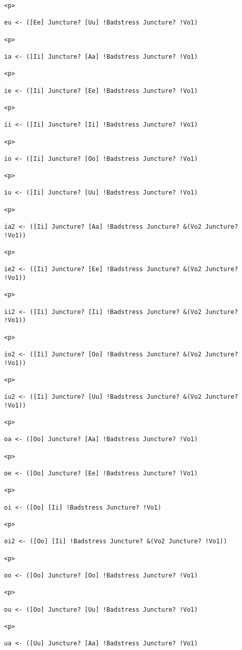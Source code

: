 \documentclass[12pt]{article}
\begin{document}
\begin{lstlisting}
<p>

eu <- ([Ee] Juncture? [Uu] !Badstress Juncture? !Vo1)

<p>

ia <- ([Ii] Juncture? [Aa] !Badstress Juncture? !Vo1)

<p>

ie <- ([Ii] Juncture? [Ee] !Badstress Juncture? !Vo1)

<p>

ii <- ([Ii] Juncture? [Ii] !Badstress Juncture? !Vo1)

<p>

io <- ([Ii] Juncture? [Oo] !Badstress Juncture? !Vo1)

<p>

iu <- ([Ii] Juncture? [Uu] !Badstress Juncture? !Vo1)

<p>

ia2 <- ([Ii] Juncture? [Aa] !Badstress Juncture? &(Vo2 Juncture? !Vo1))

<p>

ie2 <- ([Ii] Juncture? [Ee] !Badstress Juncture? &(Vo2 Juncture? !Vo1))

<p>

ii2 <- ([Ii] Juncture? [Ii] !Badstress Juncture? &(Vo2 Juncture? !Vo1))

<p>

io2 <- ([Ii] Juncture? [Oo] !Badstress Juncture? &(Vo2 Juncture? !Vo1))

<p>

iu2 <- ([Ii] Juncture? [Uu] !Badstress Juncture? &(Vo2 Juncture? !Vo1))

<p>

oa <- ([Oo] Juncture? [Aa] !Badstress Juncture? !Vo1)

<p>

oe <- ([Oo] Juncture? [Ee] !Badstress Juncture? !Vo1)

<p>

oi <- ([Oo] [Ii] !Badstress Juncture? !Vo1)

<p>

oi2 <- ([Oo] [Ii] !Badstress Juncture? &(Vo2 Juncture? !Vo1))

<p>

oo <- ([Oo] Juncture? [Oo] !Badstress Juncture? !Vo1)

<p>

ou <- ([Oo] Juncture? [Uu] !Badstress Juncture? !Vo1)

<p>

ua <- ([Uu] Juncture? [Aa] !Badstress Juncture? !Vo1)


\end{lstlisting}
\end{document}
